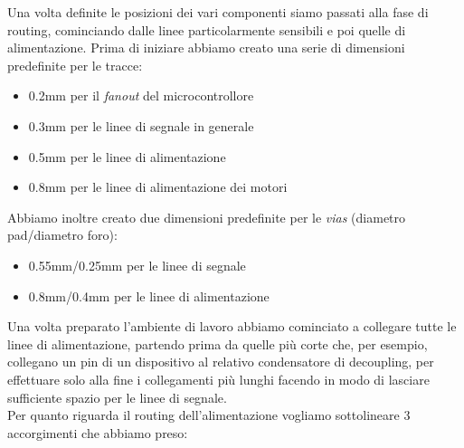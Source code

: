 \noindent Una volta definite le posizioni dei vari componenti siamo passati alla
fase di routing, cominciando dalle linee particolarmente sensibili e poi
quelle di alimentazione. Prima di iniziare abbiamo creato una serie di
dimensioni predefinite per le tracce:

\begin{itemize}
\item
  
  0.2mm per il \textit{fanout} del microcontrollore
  
\item
  
  0.3mm per le linee di segnale in generale
  
\item
  
  0.5mm per le linee di alimentazione
  
\item
  
  0.8mm per le linee di alimentazione dei motori
  
\end{itemize}

\noindent Abbiamo inoltre creato due dimensioni predefinite per le \textit{vias} (diametro
pad/diametro foro):

\begin{itemize}
\item
  
  0.55mm/0.25mm per le linee di segnale
  
\item
  
  0.8mm/0.4mm per le linee di alimentazione
  
\end{itemize}

\noindent Una volta preparato l'ambiente di lavoro abbiamo cominciato a collegare
tutte le linee di alimentazione, partendo prima da quelle più corte che,
per esempio, collegano un pin di un dispositivo al relativo condensatore
di decoupling, per effettuare solo alla fine i collegamenti più lunghi
facendo in modo di lasciare sufficiente spazio per le linee di segnale.\\
Per quanto riguarda il routing dell'alimentazione vogliamo sottolineare
3 accorgimenti che abbiamo preso:

